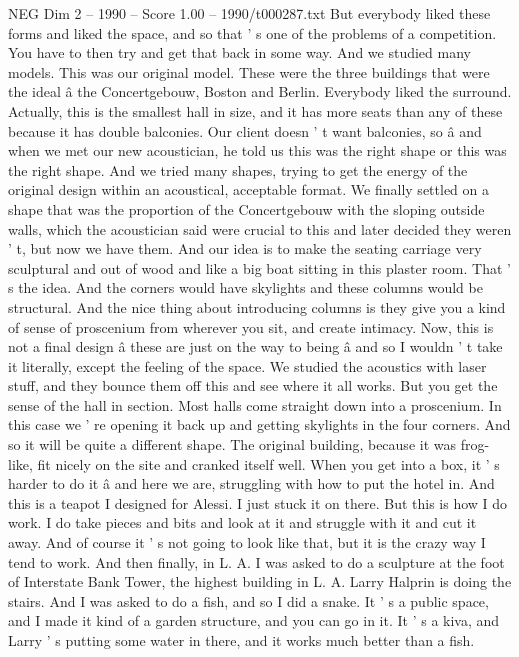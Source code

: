\begin{textsample}{NEG Dim 2 – 1990 – Score 1.00 – 1990/t000287.txt}
But everybody liked these forms and liked the space, and so that ' s one of the problems of a competition.
You have to then try and get that back in some way.
And we studied many models.
This was our original model.
These were the three buildings that were the ideal â the Concertgebouw, Boston and Berlin.
Everybody liked the surround.
Actually, this is the smallest hall in size, and it has more seats than any of these because it has double balconies.
Our client doesn ' t want balconies, so â and when we met our new acoustician, he told us this was the right shape or this was the right shape.
And we tried many shapes, trying to get the energy of the original design within an acoustical, acceptable format.
We finally settled on a shape that was the proportion of the Concertgebouw with the sloping outside walls, which the acoustician said were crucial to this and later decided they weren ' t, but now we have them.
And our idea is to make the seating carriage very sculptural and out of wood and like a big boat sitting in this plaster room.
That ' s the idea.
And the corners would have skylights and these columns would be structural.
And the nice thing about introducing columns is they give you a kind of sense of proscenium from wherever you sit, and create intimacy.
Now, this is not a final design â these are just on the way to being â and so I wouldn ' t take it literally, except the feeling of the space.
We studied the acoustics with laser stuff, and they bounce them off this and see where it all works.
But you get the sense of the hall in section.
Most halls come straight down into a proscenium.
In this case we ' re opening it back up and getting skylights in the four corners.
And so it will be quite a different shape.
The original building, because it was frog-like, fit nicely on the site and cranked itself well.
When you get into a box, it ' s harder to do it â and here we are, struggling with how to put the hotel in.
And this is a teapot I designed for Alessi.
I just stuck it on there.
But this is how I do work.
I do take pieces and bits and look at it and struggle with it and cut it away.
And of course it ' s not going to look like that, but it is the crazy way I tend to work.
And then finally, in L.
A.
I was asked to do a sculpture at the foot of Interstate Bank Tower, the highest building in L.
A.
Larry Halprin is doing the stairs.
And I was asked to do a fish, and so I did a snake.
It ' s a public space, and I made it kind of a garden structure, and you can go in it.
It ' s a kiva, and Larry ' s putting some water in there, and it works much better than a fish.

\end{textsample}

